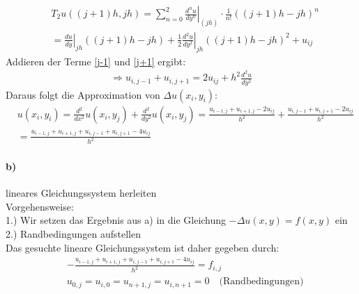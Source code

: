 \begin{align}
&T_2 u((j+1)h, jh)=\sum_{n=0}^2 \left. \frac{d^n u}{dy^n} \right|_{(jh)} \cdot \frac{1}{n!}((j+1)h-jh)^n\\ &=\left.\frac{du}{dy}\right |_{jh} ((j+1)h-jh)+\left.\frac{1}{2}\frac{d^2u}{dy^2}\right|_{jh}((j+1)h-jh)^2+u_{ij}\label{j+1}
\end{align}
Addieren der Terme \eqref{j-1} und \eqref{j+1} ergibt:
\begin{align*}
\Rightarrow u_{i, j-1}+u_{i, j+1}=2u_{ij} + h^2 \frac{d^2u}{dy^2}
\end{align*}
Daraus folgt die Approximation von $\Delta u(x_i,y_i)$:
\begin{align*}
&u(x_i, y_i)=\frac{d^2}{dx^2}u(x_i,y_j)+\frac{d^2}{dy^2}u(x_i,y_j)=\frac{u_{i-1,j}+u_{i+1,j}-2u_{ij}}{h^2}+\frac{u_{i, j-1}+u_{i, j+1}-2u_{ij}}{h^2}\\
&=\frac{u_{i-1,j}+u_{i+1,j}+u_{i, j-1}+u_{i, j+1}-4u_{ij}}{h^2}
\end{align*}
\paragraph*{b)}
lineares Gleichungssystem herleiten\\
\newline
Vorgehensweise:\\
1.) Wir setzen das Ergebnis aus a) in die Gleichung $-\Delta u(x,y)=f(x,y)$ ein\\
2.) Randbedingungen aufstellen\\
\newline
Das gesuchte lineare Gleichungssystem ist daher gegeben durch:
\begin{align*}
&-\frac{u_{i-1,j}+u_{i+1,j}+u_{i, j-1}+u_{i, j+1}-4u_{ij}}{h^2}=f_{i,j}\\
&u_{0,j}=u_{i,0}=u_{n+1,j}=u_{i,n+1}=0 \quad\text{(Randbedingungen)}
\end{align*}
